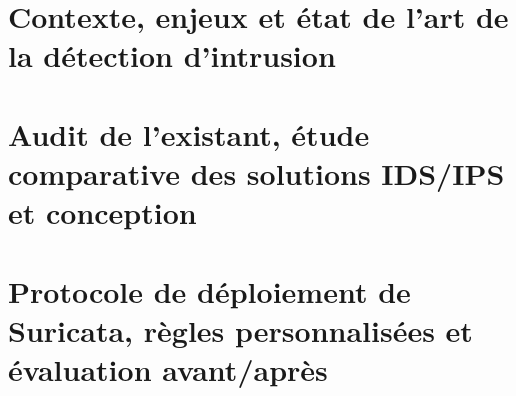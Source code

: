 \documentclass{ifri}
\begin{document}
\pageDeGarde

\pagecolor{white}





\setcounter{tocdepth}{2}


\newpage 


\newpage 


\newpage

\listoffigures 
\newpage

\listoftables
\newpage

\glsaddall
\printglossary[title=Liste des acronymes, toctitle=Liste des acronymes, type=\acronymtype]
\newpage



\setcounter{page}{1}

\fancyhead[L]{\tiny \leftmark}
\fancyhead[R]{\scriptsize \rightmark}
\fancyfoot[C]{\thepage}

\chapter{Contexte, enjeux et état de l'art de la détection d'intrusion}\label{chap:1}
 
 
\chapter{Audit de l'existant, étude comparative des solutions IDS/IPS et conception}\label{chap:2}
 
 
\chapter{Protocole de déploiement de Suricata, règles personnalisées et évaluation avant/après}\label{chap:3}
 
 
% 

% 
\lhead[]{} \rhead[]{} \chead[]{}






\end{document}

